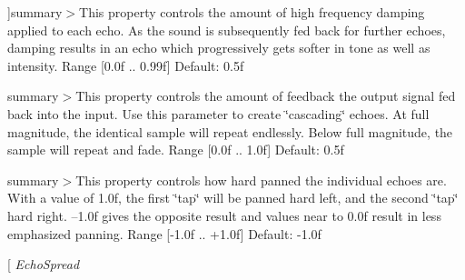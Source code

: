 \begin{Desc}
\begin{description}
{}]summary$>$This property controls the amount of high frequency damping applied to each echo. As the sound is subsequently fed back for further echoes, damping results in an echo which progressively gets softer in tone as well as intensity. Range \mbox{[}0.\-0f .. 0.\-99f\mbox{]} Default\-: 0.\-5f\item[{\em 
\hypertarget{namespace_open_t_k_1_1_audio_1_1_open_a_l_aa0356299908369b4365d28572c0ec20ba5a3a6391d34c452c50fa08550e2271eb}{Echo\-Damping}\label{namespace_open_t_k_1_1_audio_1_1_open_a_l_aa0356299908369b4365d28572c0ec20ba5a3a6391d34c452c50fa08550e2271eb}
}]summary$>$This property controls the amount of feedback the output signal fed back into the input. Use this parameter to create \char`\"{}cascading\char`\"{} echoes. At full magnitude, the identical sample will repeat endlessly. Below full magnitude, the sample will repeat and fade. Range \mbox{[}0.\-0f .. 1.\-0f\mbox{]} Default\-: 0.\-5f\item[{\em 
\hypertarget{namespace_open_t_k_1_1_audio_1_1_open_a_l_aa0356299908369b4365d28572c0ec20ba80ebfccf6b8c4e1e9379ebbfab4e8214}{Echo\-Feedback}\label{namespace_open_t_k_1_1_audio_1_1_open_a_l_aa0356299908369b4365d28572c0ec20ba80ebfccf6b8c4e1e9379ebbfab4e8214}
}]summary$>$This property controls how hard panned the individual echoes are. With a value of 1.\-0f, the first \char`\"{}tap\char`\"{} will be panned hard left, and the second \char`\"{}tap\char`\"{} hard right. –1.0f gives the opposite result and values near to 0.\-0f result in less emphasized panning. Range \mbox{[}-\/1.\-0f .. +1.0f\mbox{]} Default\-: -\/1.\-0f\item[{\em 
\hypertarget{namespace_open_t_k_1_1_audio_1_1_open_a_l_aa0356299908369b4365d28572c0ec20ba18bebfabe9ac002ba21d3e1902437d0c}{Echo\-Spread}\label{namespace_open_t_k_1_1_audio_1_1_open_a_l_aa0356299908369b4365d28572c0ec20ba18bebfabe9ac002ba21d3e1902437d0c}
}
\end{description}
\end{Desc}
